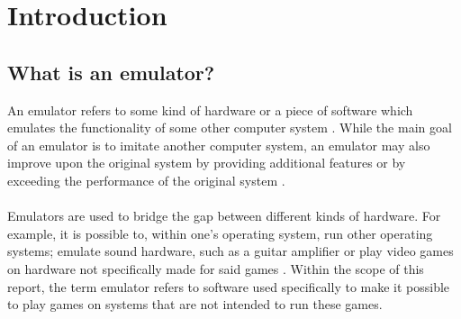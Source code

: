 \chapter{Introduction}

\section{What is an emulator?}
An emulator refers to some kind of hardware or a piece of software which emulates the functionality of some other computer system \cite{emulatortechnopedia} \cite{emulatorlifewire}. While the main goal of an emulator is to imitate another computer system, an emulator may also improve upon the original system by providing additional features or by exceeding the performance of the original system \cite{emulatorlifewire}.\\
\\
Emulators are used to bridge the gap between different kinds of hardware. For example, it is possible to, within one's operating system, run other operating systems; emulate sound hardware, such as a guitar amplifier or play video games on hardware not specifically made for said games \cite{emulatorbusinessinsider}. Within the scope of this report, the term emulator refers to software used specifically to make it possible to play games on systems that are not intended to run these games.
